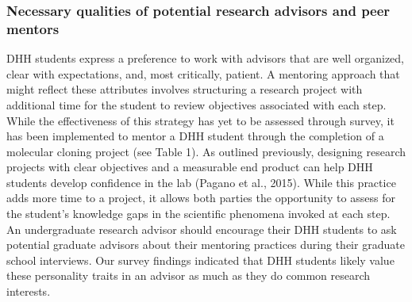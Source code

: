 \documentclass[11.5pt]{sig-alternate} %
\begin{document}
\begin{large}
\subsubsection*{Necessary qualities of potential research advisors and peer mentors} DHH students express a preference to work with advisors that are well organized, clear with expectations, and, most critically, patient. A mentoring approach that might reflect these attributes involves structuring a research project with additional time for the student to review objectives associated with each step. While the effectiveness of this strategy has yet to be assessed through survey, it has been implemented to mentor a DHH student through the completion of a molecular cloning project (see Table 1). As outlined previously, designing research projects with clear objectives and a measurable end product can help DHH students develop confidence in the lab (Pagano et al., 2015). While this practice adds more time to a project, it allows both parties the opportunity to assess for the student’s knowledge gaps in the scientific phenomena invoked at each step. An undergraduate research advisor should encourage their DHH students to ask potential graduate advisors about their mentoring practices during their graduate school interviews. Our survey findings indicated that DHH students likely value these personality traits in an advisor as much as they do common research interests.


\end{large}
\end{document}
